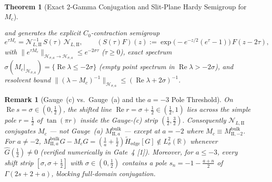 \documentclass[11pt,a4paper]{article}
\newtheorem{thm}{Theorem}
\newtheorem{remark}{Remark}
\begin{document}
\begin{thm}[Exact 2-Gamma Conjugation and Slit-Plane Hardy Semigroup for $M_c$]
\begin{enumerate}
\[  \]
  and generates the explicit $C_0$-contraction semigroup
  \[
  e^{\tau M_c} = \mathcal{N}_{L,\mathrm{II}}^{-1}\,S(\tau)\,\mathcal{N}_{L,\mathrm{II}}, \qquad (S(\tau)F)(z) := \exp\!\Big(-e^{-z/2}(e^\tau - 1)\Big)\,F(z - 2\tau),
  \]
  with $\|e^{\tau M_c}\|_{\mathcal{H}_{\sigma,a}\to\mathcal{H}_{\sigma,a}} \le e^{-2\sigma\tau}$ ($\tau \ge 0$), exact spectrum $\sigma(M_c|_{\mathcal{H}_{\sigma,a}}) = \{\operatorname{Re}\lambda \le -2\sigma\}$ (empty point spectrum in $\operatorname{Re}\lambda > -2\sigma$), and resolvent bound $\|(\lambda - M_c)^{-1}\|_{\mathcal{H}_{\sigma,a}} \le (\operatorname{Re}\lambda + 2\sigma)^{-1}$.
\end{enumerate}
\end{thm}

\begin{remark}[Gauge~(c) vs.\ Gauge~(a) and the $a = -3$ Pole Threshold]\label{rem:thm1_gauge}
On $\operatorname{Re} s = \sigma \in (0,\frac{1}{2})$, the shifted line $\operatorname{Re} r = \sigma + \frac{1}{2} \in (\frac{1}{2}, 1)$ lies across the simple pole $r = \frac{1}{2}$ of $\tan(\pi r)$ inside the Gauge-(c) strip $(\frac{1}{2}, \frac{3}{2})$. Consequently $\mathcal{N}_{L,\mathrm{II}}$ conjugates $M_c$ --- not Gauge~(a) $M_{\mathrm{II},a}^{\mathrm{bulk}}$ --- except at $a = -2$ where $M_c \equiv M_{\mathrm{II},-2}^{\mathrm{bulk}}$. For $a \ne -2$, $M_{\mathrm{II},a}^{\mathrm{bulk}} G - M_c G = (\frac{1}{a}+\frac{1}{2})\widetilde{H}_{\mathrm{edge}}[G] \notin L^2_\sigma(\mathbb{R})$ whenever $\widehat{G}(\frac{1}{2}) \ne 0$ (verified numerically in Gate~4 {[1]}). Moreover, for $a \le -3$, every shift strip $[\sigma, \sigma+\frac{1}{2}]$ with $\sigma \in (0,\frac{1}{2})$ contains a pole $s_n = -1 - \frac{a+n}{2}$ of $\Gamma(2s+2+a)$, blocking full-domain conjugation.
\end{remark}
\end{document}

